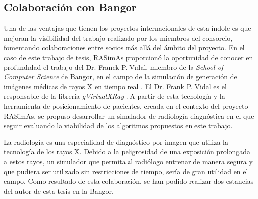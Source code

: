 \subsection{Colaboración con \acl{Bangor}}
%
Una de las ventajas que tienen los proyectos internacionales de esta índole es que mejoran la visibilidad del trabajo realizado por los miembros del consorcio, fomentando colaboraciones entre socios más allá del ámbito del proyecto.
%
En el caso de este trabajo de tesis, \ac{RASimAs} proporcionó la oportunidad de conocer en profundidad el trabajo del  Dr. Franck P. Vidal, miembro de la \emph{School of Computer Science} de \acl{Bangor}, en el campo de la simulación de generación de imágenes médicas de rayos X en tiempo real \cite{villard2014interventional}. El Dr. Frank P. Vidal es el responsable de la librería \emph{gVirtualXRay} \cite{gVirtualXRay}.
%
A partir de esta tecnología y la herramienta de posicionamiento de pacientes, creada en el contexto del proyecto \ac{RASimAs}, se propuso desarrollar un simulador de radiología diagnóstica en el que seguir evaluando la viabilidad de los algoritmos propuestos en este trabajo.

La radiología es una especialidad de diagnóstico por imagen que utiliza la tecnología de los rayos X. Debido a la peligrosidad de una exposición prolongada a estos rayos, un simulador que permita al radiólogo entrenar de manera segura y que pudiera ser utilizado sin restricciones de tiempo, sería de gran utilidad en el campo.
Como resultado de esta colaboración, se han podido realizar dos estancias del autor de esta tesis en la \acl{Bangor}. 






